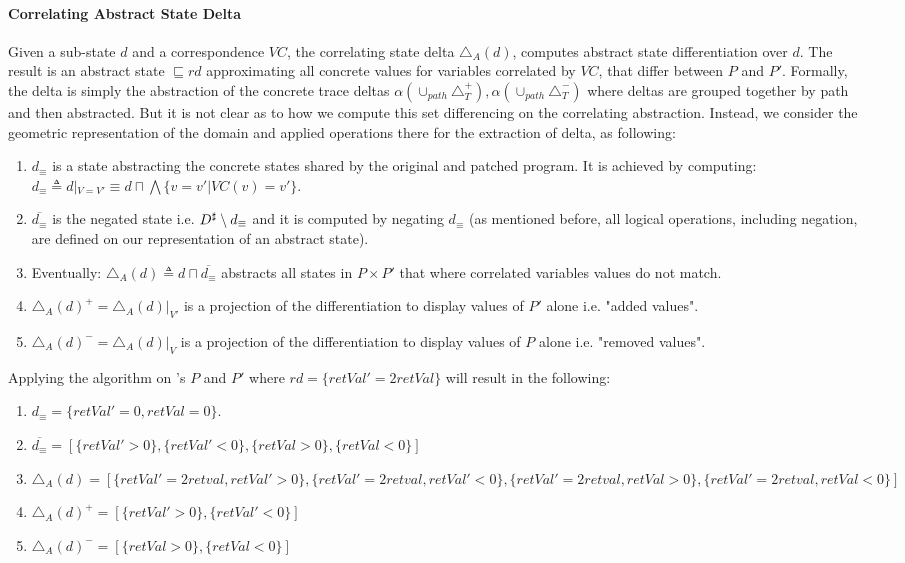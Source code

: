 \paragraph{Correlating Abstract State Delta} 
Given a sub-state $d$ and a correspondence $VC$, the correlating state delta $\triangle_{A}(d)$, computes abstract state differentiation over $d$. The result is an abstract state $\sqsubseteq rd$ approximating all concrete values for variables correlated by $VC$, that differ between $P$ and $P'$. Formally, the delta is simply the abstraction of the concrete trace deltas $\alpha(\cup_{path}\triangle_{T}^{+}), \alpha(\cup_{path}\triangle_{T}^{-})$ where deltas are grouped together by path and then abstracted. But it is not clear as to how we compute this set differencing on the correlating abstraction. Instead, we consider the geometric representation of the domain and applied operations there for the extraction of delta, as following:
\begin{enumerate}
\item $d_{\equiv}$ is a state abstracting the concrete states shared by the original and patched program. It is achieved by computing: $d_{\equiv} \triangleq d|_{V=V'} \equiv d \sqcap \bigwedge\{ v = v' | VC(v) = v'\}$.
\item $\overline{d_{\equiv}}$ is the negated state i.e. $D^\sharp \setminus d_{\equiv}$ and it is computed by negating $d_{\equiv}$ (as mentioned before, all logical operations, including negation, are defined on our representation of an abstract state).
\item Eventually: $\triangle_{A}(d) \triangleq d \sqcap \overline{d_{\equiv}}$ abstracts all states in $P \times P'$ that where correlated variables values do not match.
\item $\triangle_{A}(d)^{+} = \triangle_{A}(d)|_{V'}$ is a projection of the differentiation to display values of $P'$ alone i.e. "added values".
\item $\triangle_{A}(d)^{-} = \triangle_{A}(d)|_{V}$ is a projection of the differentiation to display values of $P$ alone i.e. "removed values".
\end{enumerate}
Applying the algorithm on 's $P$ and $P'$ where $rd = \{ retVal' = 2retVal \}$ will result in the following:
\begin{enumerate}
\item $d_{\equiv} = \{ retVal' = 0, retVal = 0 \}$.
\item $\overline{d_{\equiv}} = [ \{ retVal' > 0 \}, \{ retVal' < 0 \}, \{ retVal > 0 \}, \{ retVal < 0 \} ]$
\item $\triangle_{A}(d)  = [ \{ retVal' = 2retval, retVal' > 0 \}, \{ retVal' = 2retval, retVal' < 0 \}, \{ retVal' = 2retval, retVal > 0 \}, \{ retVal' = 2retval, retVal < 0 \} ]$
\item $\triangle_{A}(d)^{+} = [ \{ retVal' > 0 \}, \{ retVal' < 0 \} ]$
\item $\triangle_{A}(d)^{-} = [\{ retVal > 0 \}, \{ retVal < 0 \}]$
\end{enumerate}
